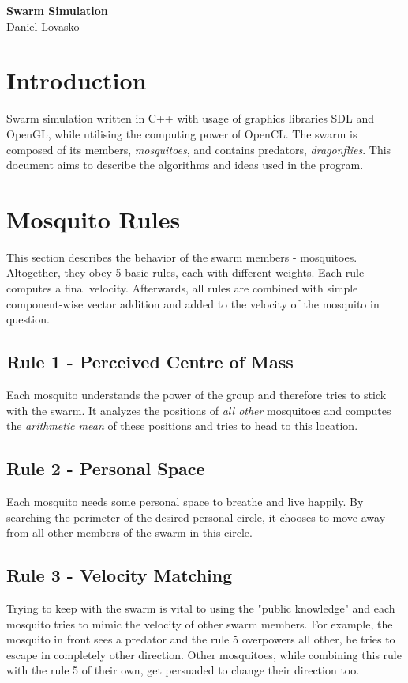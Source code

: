 \documentclass{article}
\begin{document}
	\begin{center}
	{\Huge \bf Swarm Simulation} \\
	{\large Daniel Lovasko} \\[1\baselineskip]
	\end{center}
\section*{Introduction}
Swarm simulation written in C++ with usage of graphics libraries SDL and
OpenGL, while utilising the computing power of OpenCL. The swarm is composed of
its members, {\it mosquitoes}, and contains predators, {\it dragonflies}.
This document aims to describe the algorithms and ideas used in the program.

\section{Mosquito Rules} This section describes the behavior of the swarm
members - mosquitoes. Altogether, they obey 5 basic rules, each with different
weights. Each rule computes a final velocity. Afterwards, all rules are
combined with simple component-wise vector addition and added to the velocity
of the mosquito in question.

\subsection{Rule 1 - Perceived Centre of Mass}
Each mosquito understands the power of the group and therefore tries to stick
with the swarm. It analyzes the positions of {\it all other} mosquitoes and
computes the {\it arithmetic mean} of these positions and tries to head to this
location.
\subsection{Rule 2 - Personal Space}
Each mosquito needs some personal space to breathe and live happily. By
searching the perimeter of the desired personal circle, it chooses to move away
from all other members of the swarm in this circle.
\subsection{Rule 3 - Velocity Matching}
Trying to keep with the swarm is vital to using the "public knowledge" and each
mosquito tries to mimic the velocity of other swarm members. For example, the
mosquito in front sees a predator and the rule 5 overpowers all other, he tries
to escape in completely other direction. Other mosquitoes, while combining this
rule with the rule 5 of their own, get persuaded to change their direction too.
\end{document}

